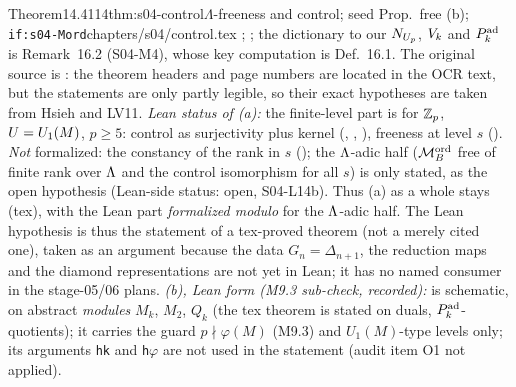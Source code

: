 \begin{quoted}{Theorem}{14.4}{114}{thm:s04-control}{$\Lambda$-freeness and control; seed Prop.~free (b); \texttt{if:s04-Mord}}{chapters/s04/control.tex}
\cite[{Thm.~4.2(2), p.~32 (forms side; via
[Hid88b, Thm.~9.4])}]{Hs}; \cite[{Thm.~3.7, p.~28 (eigen-components,
over a field)}]{LV11}; the dictionary to our $N_{U_p}$, $V_k$ and $P^{\rm ad}_k$ is Remark~16.2 (S04-M4), whose key
computation is Def.~16.1. The original source is
\cite[{Thm.~8.6, p.~362 (weight independence of $\mathcal V^{\rm ord}$);
Thm.~9.4, p.~369 (control); Thm.~10.1, p.~370 (freeness over $\cO[[Z_a]]$ under $p$-divisibility); Cor.~10.4, p.~373 ($\Lam$-freeness,
$p>2$)}]{Hi88b}: the theorem headers and page numbers are located in the OCR text, but the statements are only partly legible, so their exact
hypotheses are taken from Hsieh and LV11.
\emph{Lean status of (a):} the finite-level part is \stformal{} for $\mathbb{Z}_p$, $U=U_1(M)$, $p\ge5$: control as surjectivity plus kernel
(, ,
), freeness at level $s$ (). \emph{Not} formalized:
the constancy of the rank in $s$ (); the $\Lam$-adic half ($\mathcal{M}^{\mathrm{ord}}_B$ free of finite rank over $\Lam$ and the control
isomorphism for all $s$) is only stated, as the open hypothesis  (Lean-side status: open, S04-L14b). Thus
(a) as a whole stays \stproved{} (tex), with the Lean part \emph{formalized modulo } for the $\Lam$-adic half. The
Lean hypothesis  is thus the statement of a tex-proved theorem (not a merely cited one), taken as an argument because the data
$G_n=\Delta_{n+1}$, the reduction maps and the diamond representations are not yet in Lean; it has no named consumer in the stage-05/06 plans.
\emph{(b), Lean form (M9.3 sub-check, recorded):}  is schematic, on abstract \emph{modules} $M_k$, $M_2$, $Q_k$ (the tex theorem is stated on
duals, $P^{\rm ad}_k$-quotients); it carries the guard $p\nmid\varphi(M)$ (M9.3) and $U_1(M)$-type levels only; its arguments \texttt{hk} and \texttt{h$\varphi$} are not used in the
statement (audit item O1 not applied).
\end{quoted}
